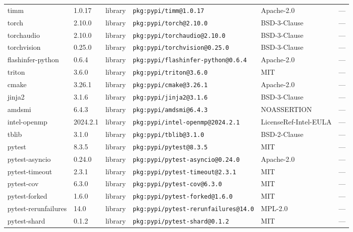 \documentclass[11pt,a4paper]{article}
\begin{document}
\begin{longtable}{|p{4cm}|p{2cm}|p{1.6cm}|p{5cm}|p{1.5cm}|p{3.5cm}|}
\raggedright timm & 1.0.17 & library & \small\texttt{pkg:pypi/timm@1.0.17} & Apache-2.0 & \small — \\
\raggedright torch & 2.10.0 & library & \small\texttt{pkg:pypi/torch@2.10.0} & BSD-3-Clause & \small — \\
\raggedright torchaudio & 2.10.0 & library & \small\texttt{pkg:pypi/torchaudio@2.10.0} & BSD-3-Clause & \small — \\
\raggedright torchvision & 0.25.0 & library & \small\texttt{pkg:pypi/torchvision@0.25.0} & BSD-3-Clause & \small — \\
\raggedright flashinfer-python & 0.6.4 & library & \small\texttt{pkg:pypi/flashinfer-python@0.6.4} & Apache-2.0 & \small — \\
\raggedright triton & 3.6.0 & library & \small\texttt{pkg:pypi/triton@3.6.0} & MIT & \small — \\
\raggedright cmake & 3.26.1 & library & \small\texttt{pkg:pypi/cmake@3.26.1} & Apache-2.0 & \small — \\
\raggedright jinja2 & 3.1.6 & library & \small\texttt{pkg:pypi/jinja2@3.1.6} & BSD-3-Clause & \small — \\
\raggedright amdsmi & 6.4.3 & library & \small\texttt{pkg:pypi/amdsmi@6.4.3} & NOASSERTION & \small — \\
\raggedright intel-openmp & 2024.2.1 & library & \small\texttt{pkg:pypi/intel-openmp@2024.2.1} & LicenseRef-Intel-EULA & \small — \\
\raggedright tblib & 3.1.0 & library & \small\texttt{pkg:pypi/tblib@3.1.0} & BSD-2-Clause & \small — \\
\raggedright pytest & 8.3.5 & library & \small\texttt{pkg:pypi/pytest@8.3.5} & MIT & \small — \\
\raggedright pytest-asyncio & 0.24.0 & library & \small\texttt{pkg:pypi/pytest-asyncio@0.24.0} & Apache-2.0 & \small — \\
\raggedright pytest-timeout & 2.3.1 & library & \small\texttt{pkg:pypi/pytest-timeout@2.3.1} & MIT & \small — \\
\raggedright pytest-cov & 6.3.0 & library & \small\texttt{pkg:pypi/pytest-cov@6.3.0} & MIT & \small — \\
\raggedright pytest-forked & 1.6.0 & library & \small\texttt{pkg:pypi/pytest-forked@1.6.0} & MIT & \small — \\
\raggedright pytest-rerunfailures & 14.0 & library & \small\texttt{pkg:pypi/pytest-rerunfailures@14.0} & MPL-2.0 & \small — \\
\raggedright pytest-shard & 0.1.2 & library & \small\texttt{pkg:pypi/pytest-shard@0.1.2} & MIT & \small — \\

\end{longtable}
\end{document}
